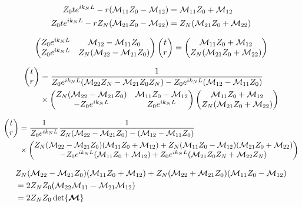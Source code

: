 \begin{align*}
	Z_0 t e^{ik_N L} - r\pqty{\mathcal{M}_{11}Z_0 - \mathcal{M}_{12}} &= \mathcal{M}_{11}Z_0 + \mathcal{M}_{12}  \\
	Z_0 t e^{ik_N L} - rZ_N\pqty{\mathcal{M}_{21}Z_0 - \mathcal{M}_{22}} &= Z_N\pqty{\mathcal{M}_{21}Z_0 + \mathcal{M}_{22}}
\end{align*}

\begin{align*}
	\pmqty{Z_0 e^{ik_N L} & \mathcal{M}_{12} - \mathcal{M}_{11}Z_0 \\ Z_0 e^{ik_N L} & Z_N\pqty{\mathcal{M}_{22} - \mathcal{M}_{21}Z_0} }\pmqty{t\\r} 
	= 
	\pmqty{\mathcal{M}_{11}Z_0 + \mathcal{M}_{12} \\ Z_N\pqty{\mathcal{M}_{21}Z_0 + \mathcal{M}_{22}}}
\end{align*}

\begin{align*}
	\pmqty{t\\r} &= \frac{1}{Z_0 e^{ik_N L}\pqty{\mathcal{M}_{22}Z_N - \mathcal{M}_{21}Z_0Z_N} - Z_0 e^{ik_N L} \pqty{\mathcal{M}_{12} - \mathcal{M}_{11}Z_0}}  \\
	&\times
	\pmqty{
		Z_N\pqty{\mathcal{M}_{22} - \mathcal{M}_{21}Z_0} & 
		\mathcal{M}_{11}Z_0 - \mathcal{M}_{12} \\ 
		-Z_0 e^{ik_N L} &  
		Z_0 e^{ik_N L} 
		}\pmqty{\mathcal{M}_{11}Z_0 + \mathcal{M}_{12} \\ Z_N\pqty{\mathcal{M}_{21}Z_0 + \mathcal{M}_{22}}}
\end{align*}

\begin{align*}
	\pmqty{t\\r} &= \frac{1}{Z_0 e^{ik_N L}}\frac{1}{Z_N\pqty{\mathcal{M}_{22} - \mathcal{M}_{21}Z_0} -  \pqty{\mathcal{M}_{12} - \mathcal{M}_{11}Z_0}}  \\
	&\times
	\pmqty{
	Z_N\pqty{\mathcal{M}_{22} - \mathcal{M}_{21}Z_0}\pqty{\mathcal{M}_{11}Z_0 + \mathcal{M}_{12}} 
	+ Z_N\pqty{\mathcal{M}_{11}Z_0 - \mathcal{M}_{12}}\pqty{\mathcal{M}_{21}Z_0 + \mathcal{M}_{22}} \\
	-Z_0 e^{ik_N L}\pqty{\mathcal{M}_{11}Z_0 + \mathcal{M}_{12}} 
	+ Z_0 e^{ik_N L}\pqty{\mathcal{M}_{21}Z_0Z_N + \mathcal{M}_{22}Z_N}
	}
\end{align*}

\begin{align*}
	&Z_N\pqty{\mathcal{M}_{22} - \mathcal{M}_{21}Z_0}\pqty{\mathcal{M}_{11}Z_0 + \mathcal{M}_{12}} 
	+ Z_N\pqty{\mathcal{M}_{22} + \mathcal{M}_{21}Z_0}\pqty{\mathcal{M}_{11}Z_0 - \mathcal{M}_{12}} \\
	&= 2Z_NZ_0\pqty{\mathcal{M}_{22}\mathcal{M}_{11} - \mathcal{M}_{21}\mathcal{M}_{12}} \\
	&= 2Z_NZ_0\det{\boldsymbol{\mathcal{M}}}
\end{align*}

